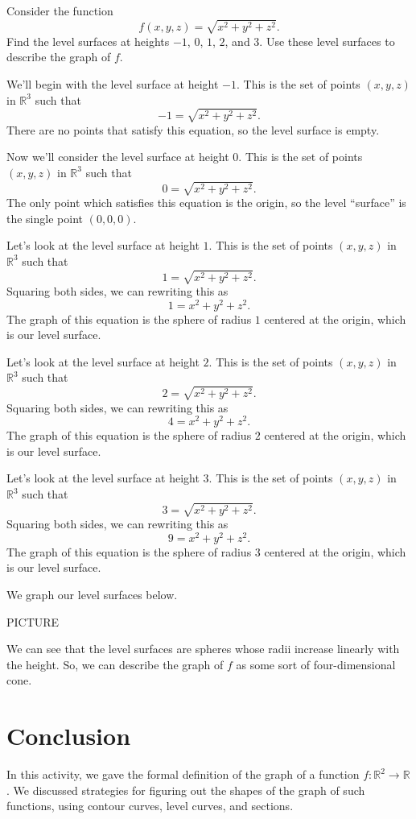 \documentclass{ximera}
\begin{document}
\begin{example}
Consider the function
\[
f(x,y,z) = \sqrt{x^2 + y^2 + z^2}.
\]
Find the level surfaces at heights $-1$, $0$, $1$, $2$, and $3$. Use these level surfaces to describe the graph of $f$.

We'll begin with the level surface at height $-1$. This is the set of points $(x,y,z)$ in $\mathbb{R}^3$ such that
\[
-1 = \sqrt{x^2+y^2+z^2}.
\]
There are no points that satisfy this equation, so the level surface is empty.

Now we'll consider the level surface at height $0$. This is the set of points $(x,y,z)$ in $\mathbb{R}^3$ such that
\[
0 = \sqrt{x^2+y^2+z^2}.
\]
The only point which satisfies this equation is the origin, so the level ``surface'' is the single point $(0,0,0)$.

Let's look at the level surface at height $1$. This is the set of points $(x,y,z)$ in $\mathbb{R}^3$ such that
\[
1 = \sqrt{x^2+y^2+z^2}.
\]
Squaring both sides, we can rewriting this as 
\[
1 = x^2+y^2+z^2.
\]
The graph of this equation is the sphere of radius $1$ centered at the origin, which is our level surface.

Let's look at the level surface at height $2$. This is the set of points $(x,y,z)$ in $\mathbb{R}^3$ such that
\[
2 = \sqrt{x^2+y^2+z^2}.
\]
Squaring both sides, we can rewriting this as 
\[
4 = x^2+y^2+z^2.
\]
The graph of this equation is the sphere of radius $2$ centered at the origin, which is our level surface.

Let's look at the level surface at height $3$. This is the set of points $(x,y,z)$ in $\mathbb{R}^3$ such that
\[
3 = \sqrt{x^2+y^2+z^2}.
\]
Squaring both sides, we can rewriting this as 
\[
9 = x^2+y^2+z^2.
\]
The graph of this equation is the sphere of radius $3$ centered at the origin, which is our level surface.

We graph our level surfaces below.

PICTURE

We can see that the level surfaces are spheres whose radii increase linearly with the height. So, we can describe the graph of $f$ as some sort of four-dimensional cone.

\end{example}


\section{Conclusion}

In this activity, we gave the formal definition of the graph of a function $f:\mathbb{R}^2\rightarrow\mathbb{R}$. We discussed strategies for figuring out the shapes of the graph of such functions, using contour curves, level curves, and sections.
\end{document}

